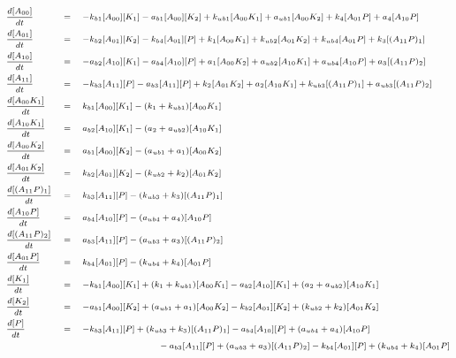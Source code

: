 \documentclass[9pt,lineno]{elife}
\begin{document}
\begin{appendixbox}
\begin{equation}
\scriptsize{    \begin{alignedat}{3}
& \frac{d[A_{00}]}{dt} \quad &&= \quad -k_{b1}[A_{00}][K_1]-a_{b1}[A_{00}][K_2]+k_{ub1}[A_{00}K_1]+a_{ub1}[A_{00}K_2]+k_4[A_{01}P]+a_4[A_{10}P] && \\  
        & \frac{d[A_{01}]}{dt} \quad &&= \quad -k_{b2}[A_{01}][K_2]-k_{b4}[A_{01}][P]+k_1[A_{00}K_1]+k_{ub2}[A_{01}K_2]+k_{ub4}[A_{01}P]+k_3[(A_{11}P)_1] && \\  
        & \frac{d[A_{10}]}{dt} \quad &&= \quad -a_{b2}[A_{10}][K_1]-a_{b4}[A_{10}][P]+a_1[A_{00}K_2]+a_{ub2}[A_{10}K_1]+a_{ub4}[A_{10}P]+a_3[(A_{11}P)_2] && \\  
        & \frac{d[A_{11}]}{dt} \quad &&= \quad -k_{b3}[A_{11}][P]-a_{b3}[A_{11}][P]+k_2[A_{01}K_2]+a_2[A_{10}K_1]+k_{ub3}[(A_{11}P)_1]+a_{ub3}[(A_{11}P)_2] && \\  
        & \frac{d[A_{00}K_1]}{dt} \quad &&= \quad k_{b1}[A_{00}][K_1]-(k_1+k_{ub1})[A_{00}K_1] && \\  
        & \frac{d[A_{10}K_1]}{dt} \quad &&= \quad a_{b2}[A_{10}][K_1]-(a_2+a_{ub2})[A_{10}K_1] && \\  
        & \frac{d[A_{00}K_2]}{dt} \quad &&= \quad a_{b1}[A_{00}][K_2]-(a_{ub1}+a_1)[A_{00}K_2] && \\  
        & \frac{d[A_{01}K_2]}{dt} \quad &&= \quad k_{b2}[A_{01}][K_2]-(k_{ub2}+k_2)[A_{01}K_2] && \\  
        & \frac{d[(A_{11}P)_1]}{dt} \quad &&= \quad k_{b3}[A_{11}][P]-(k_{ub3}+k_3)[(A_{11}P)_1] && \\  
        & \frac{d[A_{10}P]}{dt} \quad &&= \quad a_{b4}[A_{10}][P]-(a_{ub4}+a_4)[A_{10}P] && \\  
        & \frac{d[(A_{11}P)_2]}{dt} \quad &&= \quad a_{b3}[A_{11}][P]-(a_{ub3}+a_3)[(A_{11}P)_2] && \\  
        & \frac{d[A_{01}P]}{dt} \quad &&= \quad k_{b4}[A_{01}][P]-(k_{ub4}+k_4)[A_{01}P] && \\
        & \frac{d[K_1]}{dt} \quad &&= \quad -k_{b1}[A_{00}][K_1]+(k_1+k_{ub1})[A_{00}K_1]-a_{b2}[A_{10}][K_1]+(a_2+a_{ub2})[A_{10}K_1] && \\
        & \frac{d[K_2]}{dt} \quad &&= \quad -a_{b1}[A_{00}][K_2]+(a_{ub1}+a_1)[A_{00}K_2]-k_{b2}[A_{01}][K_2]+(k_{ub2}+k_2)[A_{01}K_2] && \\
        & \frac{d[P]}{dt} \quad &&= \quad -k_{b3}[A_{11}][P]+(k_{ub3}+k_3)[(A_{11}P)_1]-a_{b4}[A_{10}][P]+(a_{ub4}+a_4)[A_{10}P] && \\
        & && \hspace{30mm} -a_{b3}[A_{11}][P]+(a_{ub3}+a_3)[(A_{11}P)_2]-k_{b4}[A_{01}][P]+(k_{ub4}+k_4)[A_{01}P] && \\
    \end{alignedat} }
\end{equation}


\end{appendixbox}
\end{document}
